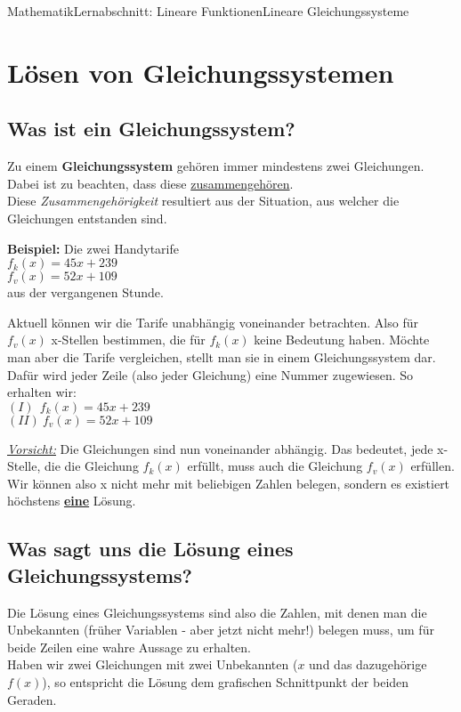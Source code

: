 \documentclass[11pt,twocolumn,oneside,openany,headings=optiontotoc,11pt,numbers=noenddot]{article}
\begin{document}
	\begin{worksheet}{Mathematik}{Lernabschnitt: Lineare Funktionen}{Lineare Gleichungssysteme}
		\section{Lösen von Gleichungssystemen}
		\label{sec:lgs}
		\subsection{Was ist ein Gleichungssystem?}
		Zu einem \textbf{Gleichungssystem} gehören immer mindestens zwei Gleichungen. Dabei ist zu beachten, dass diese \underline{zusammengehören}.\\
		Diese \textit{Zusammengehörigkeit} resultiert aus der Situation, aus welcher die Gleichungen entstanden sind.\\
		\par\noindent
		\textbf{Beispiel:} Die zwei Handytarife\\
		\(f_k(x) = 45x + 239\)\\
		\(f_v(x) = 52x + 109\)\\
		aus der vergangenen Stunde.\\
		\par\noindent
		Aktuell können wir die Tarife unabhängig voneinander betrachten. Also für \(f_v(x)\) x-Stellen bestimmen, die für \(f_k(x)\) keine Bedeutung haben. Möchte man aber die Tarife vergleichen, stellt man sie in einem Gleichungssystem dar. Dafür wird jeder Zeile (also jeder Gleichung) eine Nummer zugewiesen. So erhalten wir:\\
		\((I)\ \ f_k(x) = 45x + 239\)\\
		\((II)\ f_v(x) = 52x + 109\)\\
		\par\noindent
		\underline{\textit{Vorsicht:}} Die Gleichungen sind nun voneinander abhängig. Das bedeutet, jede x-Stelle, die die Gleichung \(f_k(x)\) erfüllt, muss auch die Gleichung \(f_v(x)\) erfüllen.\\
		Wir können also x nicht mehr mit beliebigen Zahlen belegen, sondern es existiert höchstens \underline{\textbf{eine}} Lösung.
		\subsection{Was sagt uns die Lösung eines Gleichungssystems?}
		Die Lösung eines Gleichungssystems sind also die Zahlen, mit denen man die Unbekannten (früher Variablen - aber jetzt nicht mehr!) belegen muss, um für beide Zeilen eine wahre Aussage zu erhalten.\\
		Haben wir zwei Gleichungen mit zwei Unbekannten (\(x\) und das dazugehörige \(f(x)\)), so entspricht die Lösung dem grafischen Schnittpunkt der beiden Geraden.\\

\end{worksheet}
\end{document}

